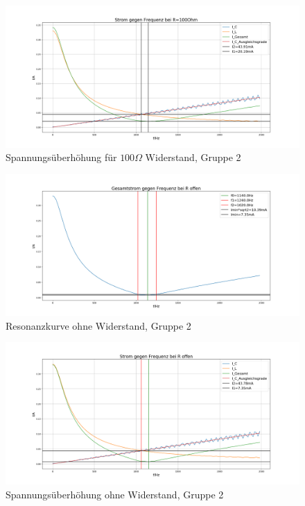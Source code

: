 \documentclass[a4paper, 11pt]{article}
\begin{document}
\begin{figure}[H]
	\hskip-2cm
	\includegraphics[trim = 0mm 0mm 0mm 0mm,clip, width=20cm]{Bilder/DPParallel100_Erhoehung.png}%
	\caption[Spannungsüberhöhung für $100 \Omega$ Widerstand, Gruppe 2]{Spannungsüberhöhung für $100 \Omega$ Widerstand, Gruppe 2}%
	\label{pic:Abbildung 3}%
\end{figure}
\begin{figure}[H]
	\hskip-2cm
	\includegraphics[trim = 0mm 0mm 0mm 0mm,clip, width=20cm]{Bilder/DPParalleloffen_Breite.png}%
	\caption[Resonanzkurve ohne Widerstand, Gruppe 2]{Resonanzkurve ohne Widerstand, Gruppe 2}%
	\label{pic:Abbildung 3}%
\end{figure}
\begin{figure}[H]
	\hskip-2cm
	\includegraphics[trim = 0mm 0mm 0mm 0mm,clip, width=20cm]{Bilder/DPParalleloo_Erhoehung.png}%
	\caption[Spannungsüberhöhung ohne Widerstand, Gruppe 2]{Spannungsüberhöhung ohne Widerstand, Gruppe 2}%
	\label{pic:Abbildung 3}%
\end{figure}
\end{document}
